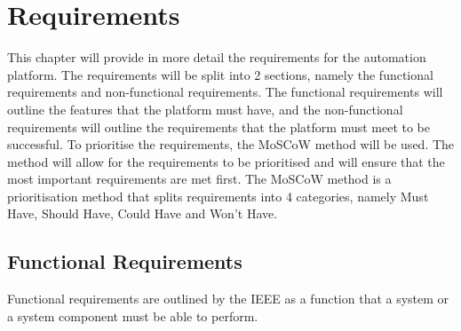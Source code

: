 \chapter{Requirements}
\label{chap:requirements}

This chapter will provide in more detail the requirements for the automation
platform. The requirements will be split into 2 sections, namely the functional
requirements and non-functional requirements. The functional requirements
will outline the features that the platform must have, and the non-functional
requirements will outline the requirements that the platform must meet to be successful.
To prioritise the requirements, the MoSCoW method will be used. The method will allow for the requirements to be prioritised and will ensure that
the most important requirements are met first. The MoSCoW method is a
prioritisation method that splits requirements into 4 categories, namely Must
Have, Should Have, Could Have and Won’t Have.
\section{Functional Requirements}
Functional requirements are outlined by the IEEE as a function that a system or a system component must be able to perform. \citep{159342}

